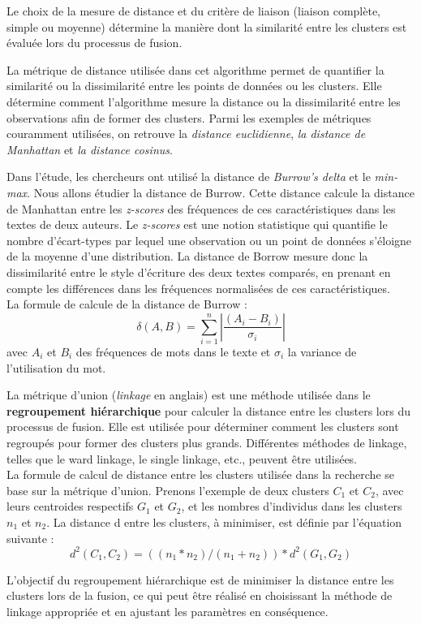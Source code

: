 \vspace{\baselineskip}
\hspace{0,5cm}Le choix de la mesure de distance et du critère de liaison (liaison complète,
simple ou moyenne) détermine la manière dont la similarité entre les clusters
est évaluée lors du processus de fusion.

\hspace{0,5cm}La métrique de distance utilisée dans cet algorithme permet de quantifier la
similarité ou la dissimilarité entre les points de données ou les clusters. Elle
détermine comment l'algorithme mesure la distance ou la dissimilarité entre les
observations afin de former des clusters. Parmi les exemples de métriques
couramment utilisées, on retrouve la \textit{distance euclidienne}, \textit{la
distance de Manhattan} et \textit{la distance cosinus}.

\hspace{0,5cm}Dans l'étude, les chercheurs ont utilisé la distance de \textit{Burrow's delta}
et le \textit{min-max}. Nous allons étudier la distance de Burrow.
Cette distance calcule la distance de Manhattan entre les \textit{z-scores} des
fréquences de ces caractéristiques dans les textes de deux auteurs.  Le
\textit{z-scores} est une notion statistique qui quantifie le nombre
d'écart-types par lequel une observation ou un point de données s'éloigne de la
moyenne d'une distribution.  La distance de Borrow mesure donc la dissimilarité
entre le style d'écriture des deux textes comparés, en prenant en compte les
différences dans les fréquences normalisées de ces caractéristiques.
\\La formule de calcule de la distance de Burrow :
\[ \delta(A,B) = \sum_{i=1}^n \left| \frac{{(A_i - B_i)}}{{\sigma_i}} \right| \]
avec $A_i$ et $B_i$ des fréquences de mots dans le texte et $\sigma_i$ la
variance de l'utilisation du mot.

\vspace{\baselineskip}
\hspace{0,5cm}La métrique d'union (\textit{linkage} en anglais) est une méthode utilisée dans
le \textbf{regroupement hiérarchique} pour calculer la distance entre les
clusters lors du processus de fusion. Elle est utilisée pour déterminer comment
les clusters sont regroupés pour former des clusters plus grands. Différentes
méthodes de linkage, telles que le ward linkage, le single linkage, etc.,
peuvent être utilisées.
\\La formule de calcul de distance entre les clusters utilisée dans la recherche
se base sur la métrique d'union. Prenons l'exemple de deux clusters
\textit{$C_1$} et \textit{$C_2$}, avec leurs centroides respectifs
\textit{$G_1$} et \textit{$G_2$}, et les nombres d'individus dans les clusters
\textit{$n_1$} et \textit{$n_2$}. La distance d entre les clusters, à minimiser,
est définie par l'équation suivante :
\[d^2( C_1,C_2) = ((n_1 * n_2) / (n_1 + n_2)) * d^2(G_1,G_2)\]

L'objectif du regroupement hiérarchique est de minimiser la distance entre les
clusters lors de la fusion, ce qui peut être réalisé en choisissant la méthode
de linkage appropriée et en ajustant les paramètres en conséquence.